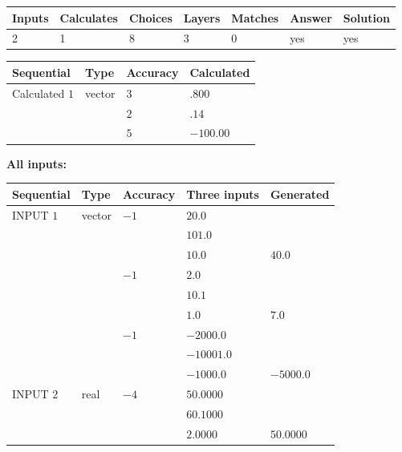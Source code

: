 \documentclass[12pt]{article}
\begin{document}
 

 
\vspace{0.3in}
   
   
   
   
\noindent\begin{tabular}{|l|l|l|l|l|l|l|}
 \hline
Inputs & Calculates & Choices & Layers & Matches & Answer & Solution \\ \hline
           2 & 
           1 & 
           8
  & 
           3 & 
           0 & 
  yes & 
  yes 
  \\ \hline
 \end{tabular}
   
   
   
   
\noindent{}
   
   
  
  
\noindent\begin{tabular}{|l|l|l|l|}
\hline
 Sequential & Type & Accuracy & Calculated \\ 
\hline
 
 
  Calculated $           1$ & vector &  
  $           3 $ 
 &  $ .800 $ 
 \\    
  & & 
  $           2 $ 
 &  $ .14 $ 
 \\    
  & & 
  $           5 $ 
 &  $ -100.00 $ 
 \\  \hline  
 \end{tabular}
   
   
   
   
\noindent\vspace{0.1in}\hspace{-0.08in} {\textbf{\Large{All inputs: }}}
   
   
  
  
\noindent\begin{tabular}{|l|l|l|l|l|}
\hline
 Sequential & Type & Accuracy & Three inputs & Generated \\ 
\hline
 
 
  INPUT $           1$ & vector & $          -1 $ & $
20.0
  $ & \\
  & & & $
101.0
  $ & \\
  & & & $
10.0
$ & $ 40.0 $ 
  \\
  & & $          -1 $ & $
2.0
  $ & \\
  & & & $
10.1
  $ & \\
  & & & $
1.0
$ & $ 7.0 $ 
  \\
  & & $          -1 $ & $
-2000.0
  $ & \\
  & & & $
-10001.0
  $ & \\
  & & & $
-1000.0
$ & $ -5000.0 $ 
 \\  \hline  
 
 
  INPUT $           2$ & real & $          -4 $ & $
 50.0000
  $ & \\
  & & &  $
 60.1000
  $ & \\
  & & &  $
 2.0000
 $ & $ 50.0000 $ 
 \\  \hline  
 \end{tabular}
   
\end{document}
